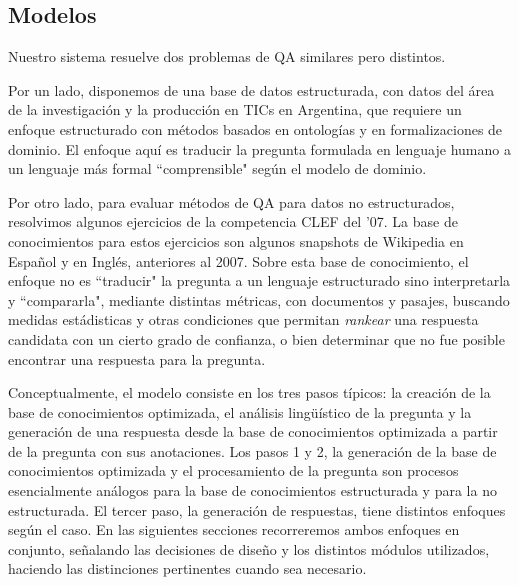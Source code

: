 \subsection{Modelos}
Nuestro sistema resuelve dos problemas de QA similares pero distintos. 

Por un lado, disponemos de una base de datos estructurada, con datos del área de la investigación y la
producción en TICs en Argentina, que requiere un enfoque estructurado con métodos basados en ontologías y en 
formalizaciones de dominio. El enfoque aquí es traducir la pregunta formulada en lenguaje humano a un lenguaje más
formal ``comprensible" según el modelo de dominio. 

Por otro lado, para evaluar métodos de QA 
para datos no estructurados, resolvimos algunos ejercicios de la competencia CLEF del '07. La base de conocimientos para
estos ejercicios son algunos snapshots de Wikipedia en Espa\~nol y en Inglés, anteriores al 2007. Sobre esta base de conocimiento,
el enfoque no es ``traducir" la pregunta a un lenguaje estructurado sino interpretarla y ``compararla", mediante distintas métricas, 
con documentos y pasajes, buscando medidas estádisticas y otras condiciones que permitan \textit{rankear} una respuesta candidata
con un cierto grado de confianza, o bien determinar que no fue posible encontrar una respuesta para la pregunta. 


Conceptualmente, el modelo consiste en los tres pasos típicos: la
creación de la base de conocimientos optimizada, el análisis
lingüístico de la pregunta y la generación de una respuesta desde
la base de conocimientos optimizada a partir de la pregunta con sus
anotaciones. 
Los pasos 1 y 2, la generación de la base de conocimientos optimizada y el procesamiento de la pregunta son procesos
esencialmente análogos para la base de conocimientos estructurada y para la no estructurada. El tercer paso, la generación de respuestas,
tiene distintos enfoques según el caso. 
En las siguientes secciones recorreremos ambos enfoques en conjunto, señalando las decisiones de dise\~no y los distintos módulos
utilizados, haciendo las distinciones pertinentes cuando sea necesario.



